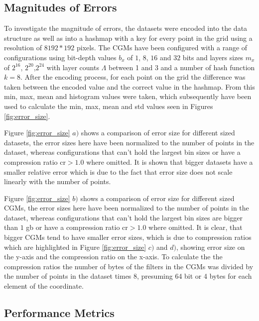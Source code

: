 \documentclass[sigconf]{acmart}
\begin{document}
\subsection{Magnitudes of Errors}

To investigate the magnitude of errors, the datasets were encoded into the data structure as well as into a hashmap with a key for every point in the grid using a resolution of $8192*192$ pixels.
The CGMs have been configured with a range of configurations using bit-depth values $b_x$ of $1$, $8$, $16$ and $32$ bits and layers sizes $m_x$ of $2^{16}$, $2^{20}$,$2^{24}$ with layer counts $\Lambda$ between 1 and 3 and a number of hash function $k=8$.
After the encoding process, for each point on the grid the difference was taken between the encoded value and the correct value in the hashmap.
From this min, max, mean and histogram values were taken, which subsequently have been used to calculate the min, max, mean and std values seen in Figures \ref{fig:error_size}.

Figure \ref{fig:error_size} $a)$ shows a comparison of error size for different sized datasets, the error sizes here have been normalized to the number of points in the dataset, whereas configurations that can't hold the largest bin sizes or have a compression ratio $\text{cr} > 1.0$ where omitted.
It is shown that bigger datasets have a smaller relative error which is due to the fact that error size does not scale linearly with the number of points.

Figure \ref{fig:error_size} $b)$ shows a comparison of error size for different sized CGMs, the error sizes here have been normalized to the number of points in the dataset, whereas configurations that can't hold the largest bin sizes are bigger than $1$ gb or have a compression ratio $\text{cr} > 1.0$ where omitted.
It is clear, that bigger CGMs tend to have smaller error sizes, which is due to compression ratios which are highlighted in Figure \ref{fig:error_size} $c)$ and $d)$, showing error size on the y-axis and the compression ratio on the x-axis. To calculate the the compression ratios the number of bytes of the filters in the CGMs was divided by the number of points in the dataset times 8, presuming 64 bit or 4 bytes for each element of the coordinate.


\subsection{Performance Metrics}
\end{document}
